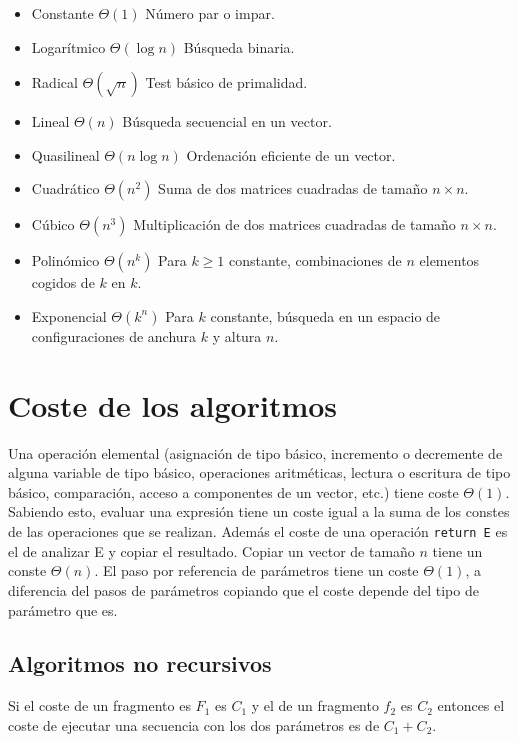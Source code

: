 \begin{itemize}
    \item Constante $\Theta(1)$ Número par o impar.
    \item Logarítmico $\Theta(\log{n})$ Búsqueda binaria.
    \item Radical $\Theta(\sqrt{n})$ Test básico de primalidad.
    \item Lineal $\Theta(n)$ Búsqueda secuencial en un vector.
    \item Quasilineal $\Theta(n \log{n})$ Ordenación eficiente de un vector.
    \item Cuadrático $\Theta(n^2)$ Suma de dos matrices cuadradas de tamaño $n
        \times n$.
    \item Cúbico $\Theta(n^3)$ Multiplicación de dos matrices cuadradas de
        tamaño $n \times n$.
    \item Polinómico $\Theta(n^k)$ Para $k \geq 1$ constante, combinaciones de
        $n$ elementos cogidos de $k$ en $k$.
    \item Exponencial $\Theta(k^n)$ Para $k$ constante, búsqueda en un espacio
        de configuraciones de anchura $k$ y altura $n$.
\end{itemize}

\section{Coste de los algoritmos}

Una operación elemental (asignación de tipo básico, incremento o decremente de
alguna variable de tipo básico, operaciones aritméticas, lectura o escritura de
tipo básico, comparación, acceso a componentes de un vector, etc.) tiene coste
$\Theta(1)$. Sabiendo esto, evaluar una expresión tiene un coste igual a la
suma de los constes de las operaciones que se realizan. Además el coste de una
operación \texttt{return E} es el de analizar E y copiar el resultado. Copiar
un vector de tamaño $n$ tiene un conste $\Theta(n)$. El paso por referencia de
parámetros tiene un coste $\Theta(1)$, a diferencia del pasos de parámetros
copiando que el coste depende del tipo de parámetro que es.

\subsection{Algoritmos no recursivos}

Si el coste de un fragmento es $F_1$ es $C_1$ y el de un fragmento $f_2$ es
$C_2$ entonces el coste de ejecutar una secuencia con los dos parámetros es de
$C_1 + C_2$.

